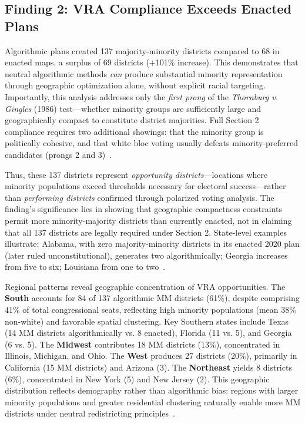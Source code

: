 \subsection{Finding 2: VRA Compliance Exceeds Enacted Plans}

Algorithmic plans created 137 majority-minority districts compared to 68 in enacted maps, a surplus of 69 districts (+101\% increase). This demonstrates that neutral algorithmic methods \emph{can} produce substantial minority representation through geographic optimization alone, without explicit racial targeting. Importantly, this analysis addresses only the \emph{first prong} of the \emph{Thornburg v. Gingles} (1986) test---whether minority groups are sufficiently large and geographically compact to constitute district majorities. Full Section 2 compliance requires two additional showings: that the minority group is politically cohesive, and that white bloc voting usually defeats minority-preferred candidates (prongs 2 and 3)~\cite{deluca2026vra}.

Thus, these 137 districts represent \emph{opportunity districts}---locations where minority populations exceed thresholds necessary for electoral success---rather than \emph{performing districts} confirmed through polarized voting analysis. The finding's significance lies in showing that geographic compactness constraints permit more minority-majority districts than currently enacted, not in claiming that all 137 districts are legally required under Section 2. State-level examples illustrate: Alabama, with zero majority-minority districts in its enacted 2020 plan (later ruled unconstitutional), generates two algorithmically; Georgia increases from five to six; Louisiana from one to two~\cite{deluca2026vra}.

Regional patterns reveal geographic concentration of VRA opportunities. The \textbf{South} accounts for 84 of 137 algorithmic MM districts (61\%), despite comprising 41\% of total congressional seats, reflecting high minority populations (mean 38\% non-white) and favorable spatial clustering. Key Southern states include Texas (14 MM districts algorithmically vs. 8 enacted), Florida (11 vs. 5), and Georgia (6 vs. 5). The \textbf{Midwest} contributes 18 MM districts (13\%), concentrated in Illinois, Michigan, and Ohio. The \textbf{West} produces 27 districts (20\%), primarily in California (15 MM districts) and Arizona (3). The \textbf{Northeast} yields 8 districts (6\%), concentrated in New York (5) and New Jersey (2). This geographic distribution reflects demography rather than algorithmic bias: regions with larger minority populations and greater residential clustering naturally enable more MM districts under neutral redistricting principles~\cite{deluca2026vra}.

